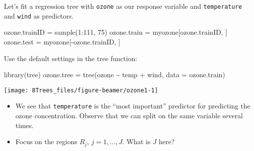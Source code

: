 \documentclass[
  10pt,
  ignorenonframetext,
]{beamer}
\newenvironment{Shaded}{\begin{snugshade}}{\end{snugshade}}
\newcommand{\AttributeTok}[1]{\textcolor[rgb]{0.77,0.63,0.00}{#1}}
\newcommand{\DecValTok}[1]{\textcolor[rgb]{0.00,0.00,0.81}{#1}}
\newcommand{\FunctionTok}[1]{\textcolor[rgb]{0.00,0.00,0.00}{#1}}
\newcommand{\NormalTok}[1]{#1}
\newcommand{\OtherTok}[1]{\textcolor[rgb]{0.56,0.35,0.01}{#1}}
\newcommand{\SpecialCharTok}[1]{\textcolor[rgb]{0.00,0.00,0.00}{#1}}
\begin{document}
\begin{frame}[fragile]
Let's fit a regression tree with \texttt{ozone} as our response variable
and \texttt{temperature} and \texttt{wind} as predictors.

\scriptsize

\begin{Shaded}
\begin{Highlighting}[]
\NormalTok{ozone.trainID }\OtherTok{=} \FunctionTok{sample}\NormalTok{(}\DecValTok{1}\SpecialCharTok{:}\DecValTok{111}\NormalTok{, }\DecValTok{75}\NormalTok{)}
\NormalTok{ozone.train }\OtherTok{=}\NormalTok{ myozone[ozone.trainID, ]}
\NormalTok{ozone.test }\OtherTok{=}\NormalTok{ myozone[}\SpecialCharTok{{-}}\NormalTok{ozone.trainID, ]}
\end{Highlighting}
\end{Shaded}

\normalsize

Use the default settings in the tree function:

\scriptsize

\begin{Shaded}
\begin{Highlighting}[]
\FunctionTok{library}\NormalTok{(tree)}
\NormalTok{ozone.tree }\OtherTok{=} \FunctionTok{tree}\NormalTok{(ozone }\SpecialCharTok{\textasciitilde{}}\NormalTok{ temp }\SpecialCharTok{+}\NormalTok{ wind, }\AttributeTok{data =}\NormalTok{ ozone.train)}
\end{Highlighting}
\end{Shaded}

\begin{center}\texttt{[image: 8Trees\_files/figure-beamer/ozone1-1]} \end{center}
\end{frame}

\begin{frame}[fragile]
\begin{itemize}
\item
  We see that \texttt{temperature} is the ``most important'' predictor
  for predicting the ozone concentration. Observe that we can split on
  the same variable several times.
\item
  Focus on the regions \(R_j\), \(j=1,\ldots, J\). What is \(J\) here?
\end{itemize}
\end{frame}
\end{document}
